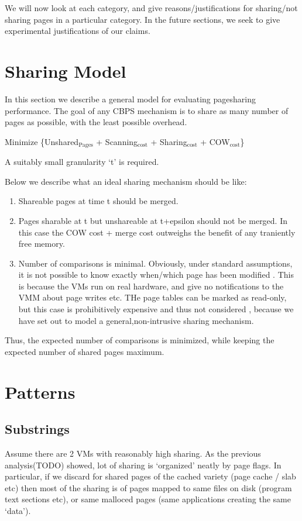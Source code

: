 \documentclass[11pt]{article}
\begin{document}
We will now look at each category, and give reasons/justifications for
sharing/not sharing pages in a particular category. In the future
sections, we seek to give experimental justifications of our claims.
\section{Sharing Model}
\label{sec-8}

In this section we describe a general model for evaluating pagesharing
performance. 
The goal of any CBPS mechanism is to share as many number of pages as
possible, with the least possible overhead. 

Minimize \{Unshared$_{\mathrm{Pages}}$ + Scanning$_{\mathrm{cost}}$ + Sharing$_{\mathrm{cost}}$ + COW$_{\mathrm{cost}}$\}

A suitably small granularity `t' is required. 

Below we describe what an ideal sharing mechanism should be like:
\begin{enumerate}
\item Shareable pages at time t should be merged.
\item Pages sharable at t but unshareable at t+epsilon should not be
   merged. In this case the COW cost + merge cost outweighs the
   benefit of any traniently free memory.
\item Number of comparisons is minimal. Obviously, under standard
   assumptions, it is not possible to know exactly when/which page has
   been modified . This is because the VMs run on real hardware, and
   give no notifications to the VMM about page writes etc. THe page
   tables can be marked as read-only, but this case is prohibitively
   expensive and thus not considered , because we have set out to
   model a general,non-intrusive sharing mechanism.
\end{enumerate}

Thus, the expected number of comparisons is minimized, while keeping
the expected number of shared pages maximum. 
\section{Patterns}
\label{sec-9}
\subsection{Substrings}
\label{sec-9_1}

Assume there are 2 VMs with reasonably high sharing. As the previous analysis(TODO) showed, lot of sharing is `organized' neatly by page flags. In particular, if we discard for shared pages of the cached variety (page cache / slab etc) then most of the sharing is of pages mapped to same files on disk (program text sections etc), or same malloced pages (same applications creating the same `data'). 
\end{document}
